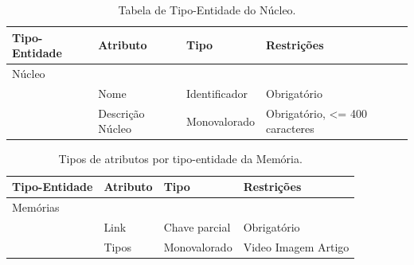 \documentclass[11pt]{../../classes/ifscarticle}
\begin{document}
\begin{table}[h]
    \centering
    \vspace{0.5cm}
    \begin{tabular}{ |p{}|p{3cm}|p{4cm}|p{}|  }
        Tipo-Entidade & Atributo         & Tipo          & Restrições                                \\ %

        \hline
        Núcleo        &                  &               &                                           \\
                      & Nome             & Identificador & Obrigatório        \linebreak             \\
                      & Descrição Núcleo & Monovalorado  & Obrigatório, <= 400 caracteres \linebreak \\

        \hline
    \end{tabular}
    \caption{Tabela de Tipo-Entidade do Núcleo.}
\end{table}


\begin{table}[h]
    \centering
    \vspace{0.5cm}
    \begin{tabular}{ |p{}|p{3cm}|p{4cm}|p{}|  }
        Tipo-Entidade & Atributo & Tipo          & Restrições                                \\ %

        \hline
        Memórias
                      &          &               &                                           \\
                      & Link     & Chave parcial & Obrigatório    \linebreak                 \\
                      & Tipos    & Monovalorado  & Video \linebreak Imagem \linebreak Artigo \\

        \hline
    \end{tabular}
    \caption{Tipos de atributos por tipo-entidade da Memória.}
\end{table}
\end{document}
